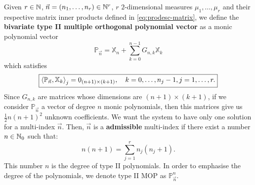 \documentclass[portrait,final,a0paper,fontscale=0.38]{baposter}
\begin{document}
\begin{poster}
{%
	}
%
	{
  Given $r\in\mathbb{N}$, $\vec n = (n_1,\dots, n_r)\in\mathbb{N}^r$, $r$ $2$-dimensional measures $\mu_1, \dots, \mu_r$ and their respective matrix inner products defined in \eqref{eq:prodesc-matrix}, we define the \textbf{bivariate type II multiple orthogonal polynomial vector} as a monic polynomial vector $$\mathbb P_{\vec n} = \mathbb X_n + \displaystyle\sum_{k=0}^{n-1}G_{n,k} \mathbb X_k$$ which satisfies
\begin{equation}
    \label{eq:typeII-MOP-d-variables}
    \boxed{
    \left\langle \mathbb P_{\vec n} , \mathbb X_k \right\rangle_j = 0_{(n+1)\times (k+1)}, \ \ \ k=0,\dots,n_j-1, j=1,\dots,r.}
\end{equation}
Since $G_{n,k}$ are matrices whose dimensions are $(n+1)\times (k+1)$, if we consider $\mathbb P_{\vec n}$ a vector of degree $n$ monic polynomials, then this matrices give us $\frac 1 2 n (n+1)^2 $ unknown coefficients. We want the system to have only one solution for a multi-index $\vec n$. Then, $\vec n$ is a \textbf{admissible} multi-index if there exist a number $n\in\mathbb{N}_0$ such that:
\begin{equation}
    \label{eq:condition-type-ii}
    \boxed{n(n+1) = \sum_{j=1}^r n_j (n_j+1).}
\end{equation}
This number $n$ is the degree of type II polynomials. In order to emphasise the degree of the polynomials, we denote type II MOP as $\mathbb P_{\vec n}^n$.

}


\end{poster}
\end{document}
